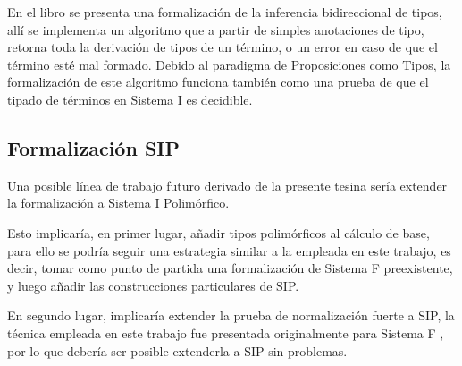 En el libro  \cite{plfa} se presenta una formalización de la inferencia bidireccional de tipos, allí se implementa un algoritmo que a partir de simples anotaciones de tipo, retorna toda la derivación de tipos de un término, o un error en caso de que el término esté mal formado.
Debido al paradigma de Proposiciones como Tipos, la formalización de este algoritmo funciona también como una prueba de que el tipado de términos en Sistema I es decidible.

\subsection{Formalización SIP}

Una posible línea de trabajo futuro derivado de la presente tesina sería extender la formalización a Sistema I Polimórfico.

Esto implicaría, en primer lugar, añadir tipos polimórficos al cálculo de base, para ello se podría seguir una estrategia similar a la empleada en este trabajo, es decir, tomar como punto de partida una formalización de Sistema F preexistente, y luego añadir las construcciones particulares de SIP.

En segundo lugar, implicaría extender la prueba de normalización fuerte a SIP, la técnica empleada en este trabajo fue presentada originalmente para Sistema F \cite{Schafer}, por lo que debería ser posible extenderla a SIP sin problemas.